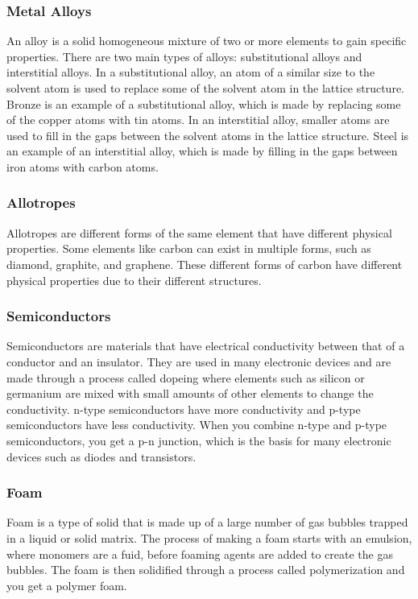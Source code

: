 \subsubsection{Metal Alloys}
An alloy is a solid homogeneous mixture of two or more elements to gain specific properties. There are two main types of alloys: substitutional alloys and interstitial alloys. In a substitutional alloy, an atom of a similar size to the solvent atom is used to replace some of the solvent atom in the lattice structure. Bronze is an example of a substitutional alloy, which is made by replacing some of the copper atoms with tin atoms. In an interstitial alloy, smaller atoms are used to fill in the gaps between the solvent atoms in the lattice structure. Steel is an example of an interstitial alloy, which is made by filling in the gaps between iron atoms with carbon atoms. 
\subsubsection{Allotropes}
Allotropes are different forms of the same element that have different physical properties. Some elements like carbon can exist in multiple forms, such as diamond, graphite, and graphene. These different forms of carbon have different physical properties due to their different structures.
\subsubsection{Semiconductors}
Semiconductors are materials that have electrical conductivity between that of a conductor and an insulator. They are used in many electronic devices and are made through a process called dopeing where elements such as silicon or germanium are mixed with small amounts of other elements to change the conductivity. n-type semiconductors have more conductivity and p-type semiconductors have less conductivity. When you combine n-type and p-type semiconductors, you get a p-n junction, which is the basis for many electronic devices such as diodes and transistors.
\subsubsection{Foam}
Foam is a type of solid that is made up of a large number of gas bubbles trapped in a liquid or solid matrix. The process of making a foam starts with an emulsion, where monomers are a fuid, before foaming agents are added to create the gas bubbles. The foam is then solidified through a process called polymerization and you get a polymer foam. 
